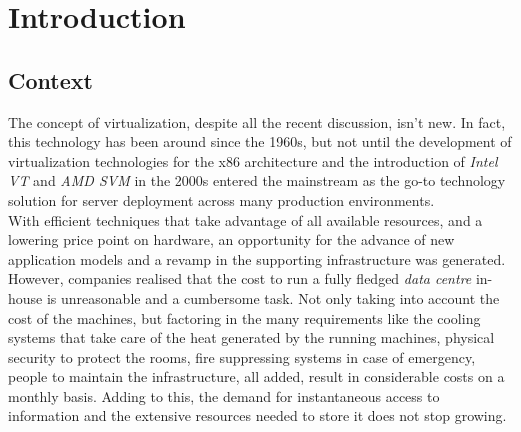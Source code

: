 \newcommand{\novathesis}{\emph{novathesis}}
\newcommand{\novathesisclass}{\texttt{novathesis.cls}}


\chapter{Introduction}
\label{cha:introduction}



\section{Context} %
\label{sec:context}

The concept of virtualization, despite all the recent discussion, isn’t new. In fact, this technology has been around since the 1960s, but not until the development of virtualization technologies for the x86 architecture and the introduction of \textit{Intel VT} and \textit{AMD SVM} in the 2000s entered the mainstream as the go-to technology solution for server deployment across many production environments. \\
%
With efficient techniques that take advantage of all available resources, and a lowering price point on hardware, an opportunity for the advance of new application models and a revamp in the supporting infrastructure was generated. 
\\

However, companies realised that the cost to run a fully fledged \textit{data centre} in-house is unreasonable and a cumbersome task. Not only taking into account the cost of the machines, but factoring in the many requirements like the cooling systems that take care of the heat generated by the running machines, physical security to protect the rooms, fire suppressing systems in case of emergency, people to maintain the infrastructure, all added, result in considerable costs on a monthly basis.
Adding to this, the demand for instantaneous access to information and the extensive resources needed to store it does not stop growing.
\\
%

